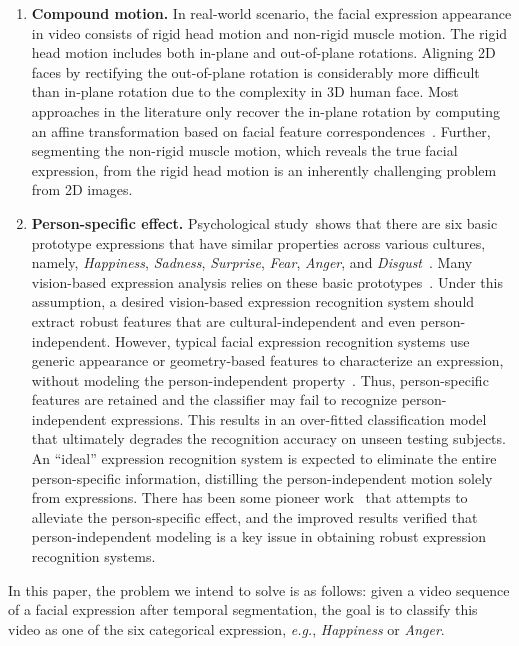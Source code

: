 \documentclass[journal]{IEEEtran}
\begin{document}
\begin{enumerate}

\item \textbf{Compound motion.} In real-world scenario, the facial expression appearance in video consists of rigid head motion and non-rigid muscle motion. The rigid head motion includes both in-plane and out-of-plane rotations. Aligning 2D faces by rectifying the out-of-plane rotation is considerably more difficult than in-plane rotation due to the complexity in 3D human face. Most approaches in the literature only recover the in-plane rotation by computing an affine transformation based on facial feature correspondences~\cite{Bartlett_FG11,Valstar_FERA11}. Further, segmenting the non-rigid muscle motion, which reveals the true facial expression, from the rigid head motion is an inherently challenging problem from 2D images.

\item \textbf{Person-specific effect.} Psychological study~shows that there are six basic prototype expressions that have similar properties across various cultures, namely, \textit{Happiness}, \textit{Sadness}, \textit{Surprise}, \textit{Fear}, \textit{Anger}, and \textit{Disgust}~\cite{Fridlund_87}.  Many vision-based expression analysis relies on these basic prototypes~\cite{Pantic_PAMI00}. Under this assumption, a desired vision-based expression recognition system should extract robust features that are cultural-independent and even person-independent. However, typical facial expression recognition systems use generic appearance or geometry-based features to characterize an expression, without modeling the person-independent property~\cite{Bartlett_FG11,Valstar_SMCB12}. Thus, person-specific features are retained and the classifier may fail to recognize person-independent expressions. This results in an over-fitted classification model that ultimately degrades the recognition accuracy on unseen testing subjects. An ``ideal'' expression recognition system is expected to eliminate the entire person-specific information, distilling the person-independent motion solely from expressions. There has been some pioneer work~\cite{Yang_SMCB12,Dahmane_TMM14} that attempts to alleviate the person-specific effect, and the improved results verified that person-independent modeling is a key issue in obtaining robust expression recognition systems.

\end{enumerate}

In this paper, the problem we intend to solve is as follows: given a video sequence of a facial expression after temporal segmentation, the goal is to classify this video as one of the six categorical expression, \textit{e.g.}, \textit{Happiness} or \textit{Anger}. 
\end{document}

